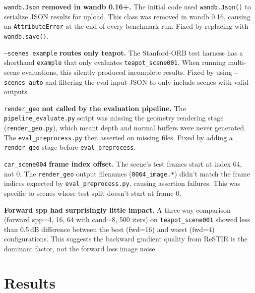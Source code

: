 \texttt{wandb.Json} \textbf{removed in wandb 0.16+.}
The initial code used \texttt{wandb.Json()} to serialize JSON results for
upload. This class was removed in wandb 0.16, causing an
\texttt{AttributeError} at the end of every benchmark run. Fixed by replacing
with \texttt{wandb.save()}.

\texttt{--scenes example} \textbf{routes only teapot.}
The Stanford-ORB test harness has a shorthand \texttt{example} that only
evaluates \texttt{teapot\_scene001}. When running multi-scene evaluations,
this silently produced incomplete results. Fixed by using \texttt{--scenes auto}
and filtering the eval input JSON to only include scenes with valid outputs.

\texttt{render\_geo} \textbf{not called by the evaluation pipeline.}
The \texttt{pipeline\_evaluate.py} script was missing the geometry rendering
stage (\texttt{render\_geo.py}), which meant depth and normal buffers were
never generated. The \texttt{eval\_preprocess.py} then asserted on missing
files. Fixed by adding a \texttt{render\_geo} stage before
\texttt{eval\_preprocess}.

\texttt{car\_scene004} \textbf{frame index offset.}
The scene's test frames start at index 64, not 0. The \texttt{render\_geo}
output filenames (\texttt{0064\_image.*}) didn't match the frame indices
expected by \texttt{eval\_preprocess.py}, causing assertion failures. This
was specific to scenes whose test split doesn't start at frame 0.

\textbf{Forward spp had surprisingly little impact.}
A three-way comparison (forward spp=4, 16, 64 with cand=8, 500 iters) on
\texttt{teapot\_scene001} showed less than 0.5\,dB difference between the
best (fwd=16) and worst (fwd=4) configurations. This suggests the backward
gradient quality from ReSTIR is the dominant factor, not the forward loss
image noise.

\section{Results}

